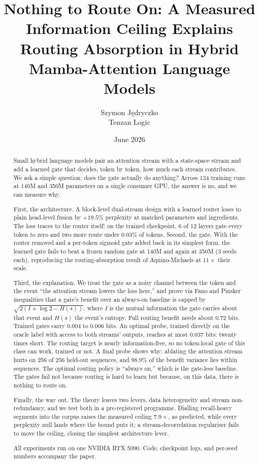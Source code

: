 \documentclass[11pt,a4paper]{article}
\title{Nothing to Route On: A Measured Information Ceiling Explains\\
Routing Absorption in Hybrid Mamba-Attention Language Models}
\author{Szymon J\k{e}dryczko \\
Tenzan Logic}
\date{June 2026}
\begin{document}
\maketitle

\begin{abstract}
Small hybrid language models pair an attention stream with a state-space
stream and add a learned gate that decides, token by token, how much each
stream contributes. We ask a simple question: does the gate actually do
anything? Across 134 training runs at 140M and 350M parameters on a single
consumer GPU, the answer is no, and we can measure why.

First, the architecture. A block-level dual-stream design with a learned
router loses to plain head-level fusion by $+19.5\%$ perplexity at matched
parameters and ingredients. The loss traces to the router itself: on the
trained checkpoint, 6 of 12 layers gate every token to zero and two more
route under $0.03\%$ of tokens. Second, the gate. With the router removed
and a per-token sigmoid gate added back in its simplest form, the learned
gate fails to beat a frozen random gate at 140M and again at 350M (3 seeds
each), reproducing the routing-absorption result of Aquino-Michaels at
$11\times$ their scale.

Third, the explanation. We treat the gate as a noisy channel between the
token and the event ``the attention stream lowers the loss here,'' and
prove via Fano and Pinsker inequalities that a gate's benefit over an
always-on baseline is capped by $\sqrt{2(I + \log 2 - H(s))}$, where $I$
is the mutual information the gate carries about that event and $H(s)$
the event's entropy. Full routing
benefit needs about $0.72$ bits. Trained gates carry $0.004$ to $0.006$
bits. An optimal probe, trained directly on the oracle label with access
to both streams' outputs, reaches at most $0.037$ bits: twenty times
short. The routing target is nearly information-free, so no token-local
gate of this class can work, trained or not. A final probe shows why:
ablating the attention stream hurts on 256 of 256 held-out sequences, and
$98.9\%$ of the benefit variance lies within sequences. The optimal
routing policy is ``always on,'' which is the gate-less baseline. The
gates fail not because routing is hard to learn but because, on this
data, there is nothing to route on.

Finally, the way out. The theory leaves two levers, data heterogeneity
and stream non-redundancy, and we test both in a pre-registered
programme. Dialling recall-heavy segments into the corpus raises the
measured ceiling $7.9\times$, as predicted, while every perplexity null
lands where the bound puts it; a stream-decorrelation regulariser fails
to move the ceiling, closing the simplest architecture lever.

All experiments run on one NVIDIA RTX 5090. Code, checkpoint logs, and
per-seed numbers accompany the paper.
\end{abstract}
\end{document}
